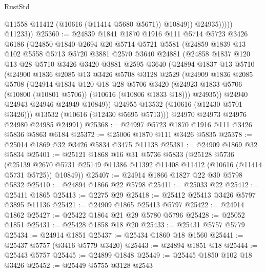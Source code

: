 \begin{lexlean}{RustStd}
\begin{coremodule}
                      @11558
                      @11412
                      (@10616 (@11414 @5680 @5671))
                      @10849))
                  @24935)))))
        @11233))
@25360 := @24839
    @1841
    @1870
    @1916
    @111
    @5714
    @5723
    @3426
    @6186
    (@24850
      @1840
      @2694
      @20
      @5714
      @5721
      @5581
      (@24859
        @1839
        @13
        @102
        @5558
        @5713
        @5720
        @3881
        @2570
        @3640
        @24881
        (@24858
          @1837
          @120
          @13
          @28
          @5710
          @3426
          @3420
          @3881
          @2595
          @3640
          (@24894
            @1837
            @13
            @5710
            (@24900
              @1836
              @2085
              @13
              @3426
              @5708
              @3128
              @2529
              (@24909
                @1836
                @2085
                @5708
                (@24914
                  @1834
                  @120
                  @18
                  @28
                  @5706
                  @3420
                  (@24923 @1833 @5706 (@10800 (@10801 @5706)) (@10616 (@10806 @1833 @18)))
                  @24935))
              @24940
              @24943
              @24946
              @24949
              @10849))
          @24955
          @13532
          (@10616 (@12430 @5701 @3426)))
        @13532
        (@10616 (@12430 @5695 @5713)))
      @24970
      @24973
      @24976
      @24980
      @24985
      @24991)
@25368 := @24997 @5723 @1870 @1916 @111 @3426 @5836 @5863 @6184
@25372 := @25006 @1870 @111 @3426 @5835
@25378 := @25014 @1869 @32 @3426 @5834 @3475 @11138
@25381 := @24909 @1869 @32 @5834
@25401 := @25121
    @1868
    @16
    @31
    @5736
    @5833
    (@25128
      @5736
      (@25139 @2670 @5731 @25149 @11386 @11392 @11408 @11412 (@10616 (@11414 @5731 @5725)) @10849))
@25407 := @24914 @1866 @1827 @22 @30 @5798 @5832
@25410 := @24894 @1866 @22 @5798
@25411 := @25033 @22
@25412 := @25411 @1865
@25413 := @2275 @29
@25418 := @25412 @25413 @3426 @5797 @3895 @11136
@25421 := @24909 @1865 @25413 @5797
@25422 := @24914 @1862
@25427 := @25422 @1864 @21 @29 @5780 @5796
@25428 := @25052 @1851
@25431 := @25428 @1858 @18 @20
@25433 := @25431 @5757 @5779
@25434 := @24914 @1851
@25437 := @25434 @1860 @18 @1560
@25441 := @25437 @5757 (@3416 @5779 @3420)
@25443 := @24894 @1851 @18
@25444 := @25443 @5757
@25445 := @24899 @1848
@25449 := @25445 @1850 @102 @18 @3426
@25452 := @25449 @5755 @3128 @2543

\end{coremodule}
\end{lexlean}
